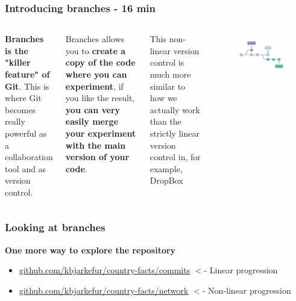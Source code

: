 \documentclass[aspectratio=169]{beamer} %
\newcommand{\trainingURL}[1]{{\color{blue}\url{#1}}}
\newcommand{\traininerUsername}{kbjarkefur}
\newcommand{\repoName}{\traininerUsername/country-facts}
\newcommand{\trainingRepoURL}[1]{\trainingURL{github.com/\repoName #1}}
\begin{document}
\begin{frame}
	\frametitle{Introducing branches  - 16 min}

	\begin{columns}[c]

		\textbf{Branches is the "killer feature" of Git}. This is where Git becomes really powerful as a collaboration tool and as version control.

		\vspace{.25cm}

		Branches allows you to \textbf{create a copy of the code where you can experiment}, if you like the result, \textbf{you can very easily merge your experiment with the main version of your code}.

		\vspace{.25cm}

		This non-linear version control is much more similar to how we actually work than the strictly linear version control in, for example, DropBox

		\begin{figure}
			\centering
			\includegraphics[width=1\linewidth]{../../Common-Resources/img/branches}
			\label{fig:branches}
		\end{figure}

	\end{columns}
\end{frame}

\begin{frame}
	\frametitle{Looking at branches}

	\textbf{One more way to explore the repository}
	\begin{itemize}
		\item \trainingRepoURL{/commits} $<$- Linear progression
		\item \trainingRepoURL{/network} $<$- Non-linear progression
	\end{itemize}
\end{frame}
\end{document}
